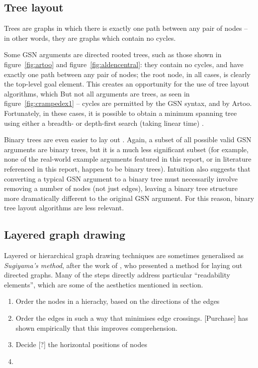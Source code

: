 \subsection{Tree layout}

Trees are graphs in which there is exactly one path between any pair of nodes -- in other words, they are graphs which contain no cycles.

Some GSN arguments are directed rooted trees, such as those shown in figure~\ref{fig:artoo} and figure~\ref{fig:aldencentral}: they contain no cycles, and have exactly one path between any pair of nodes; the root node, in all cases, is clearly the top-level goal element.
This creates an opportunity for the use of tree layout algorithms, which 
But not all arguments are trees, as seen in figure~\ref{fig:crampedex1} -- cycles are permitted by the GSN syntax, and by Artoo. Fortunately, in these cases, it is possible to obtain a minimum spanning tree using either a breadth- or depth-first search (taking linear time) . 

Binary trees are even easier to lay out \cite{handbook:tree}. Again, a subset of all possible valid GSN arguments are binary trees, but it is a much less significant subset (for example, none of the real-world example arguments featured in this report, or in literature referenced in this report, happen to be binary trees). Intuition also suggests that converting a typical GSN argument to a binary tree must necessarily involve removing a number of nodes (not just edges), leaving a binary tree structure more dramatically different to the original GSN argument. For this reason, binary tree layout algorithms are less relevant.


\subsection{Layered graph drawing}

Layered or hierarchical graph drawing techniques are sometimes generalised as \emph{Sugiyama's method}, after the work of \citet{4308636}, who presented a method for laying out directed graphs. Many of the steps directly address particular ``readability elements'', which are some of the aesthetics mentioned in section.

\begin{enumerate}
\item Order the nodes in a hierachy, based on the directions of the edges
\item Order the edges in such a way that minimises edge crossings. [Purchase] has shown empirically that this improves comprehension.
\item Decide [?] the horizontal positions of nodes
\item
\end{enumerate}

